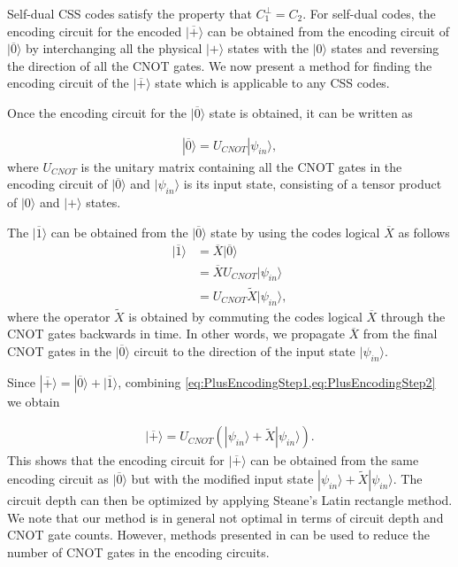 \documentclass[pra,longbibliography,twocolumn,showpacs,nofootinbib,superscriptaddress,notitlepage]{revtex4-1}
\newcommand{\ket}[1]{|#1\rangle}  %
\begin{document}
Self-dual CSS codes satisfy the property that $C_{1}^{\perp} = C_{2}$. For self-dual codes, the encoding circuit for the encoded $|\overline{+} \rangle$ can be obtained from the encoding circuit of $|\overline{0} \rangle$ by interchanging all the physical $|+\rangle$ states with the $|0\rangle$ states and reversing the direction of all the CNOT gates. We now present a method for finding the encoding circuit of the $|\overline{+} \rangle$ state which is applicable to any CSS codes. 

Once the encoding circuit for the $\ket{\overline{0}}$ state is obtained, it can be written as 

\begin{align}
\ket{\overline{0}} = U_{CNOT}\ket{\psi_{in}},
\label{eq:PlusEncodingStep1}
\end{align}
where $U_{CNOT}$ is the unitary matrix containing all the CNOT gates in the encoding circuit of $\ket{\overline{0}}$ and $\ket{\psi_{in}}$ is its input state, consisting of a tensor product of $\ket{0}$ and $\ket{+}$ states. 

The $\ket{\overline{1}}$ can be obtained from the $\ket{\overline{0}}$ state by using the codes logical $\overline{X}$ as follows
\begin{align}
\ket{\overline{1}} &= \overline{X}\ket{\overline{0}} \nonumber \\
 &=  \overline{X}U_{CNOT}\ket{\psi_{in}} \nonumber \\
 &= U_{CNOT} \tilde{X}\ket{\psi_{in}},
\label{eq:PlusEncodingStep2}
\end{align}
where the operator $\tilde{X}$ is obtained by commuting the codes logical $\overline{X}$ through the CNOT gates backwards in time. In other words, we propagate $\overline{X}$ from the final CNOT gates in the $\ket{\overline{0}}$ circuit to the direction of the input state $\ket{\psi_{in}}$. 

Since $\ket{\overline{+}} = \ket{\overline{0}} + \ket{\overline{1}}$, combining \cref{eq:PlusEncodingStep1,eq:PlusEncodingStep2} we obtain 

\begin{align}
\ket{\overline{+}} = U_{CNOT}(\ket{\psi_{in}} + \tilde{X}\ket{\psi_{in}}).
\label{eq:PlusFinal}
\end{align}
This shows that the encoding circuit for $\ket{\overline{+}}$ can be obtained from the same encoding circuit as $\ket{\overline{0}}$ but with the modified input state $\ket{\psi_{in}} + \tilde{X}\ket{\psi_{in}}$. The circuit depth can then be optimized by applying Steane's Latin rectangle method. We note that our method is in general not optimal in terms of circuit depth and CNOT gate counts. However, methods presented in \cite{CJL16b,PR12} can be used to reduce the number of CNOT gates in the encoding circuits. 
\end{document}
